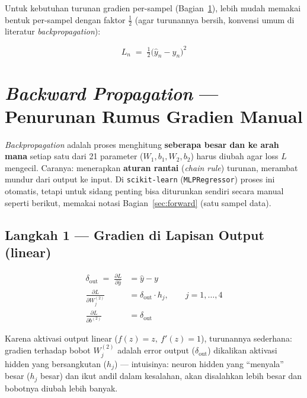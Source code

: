 \documentclass[11pt,a4paper]{article}
\begin{document}
Untuk kebutuhan turunan gradien per-sampel (Bagian~\ref{sec:backprop}), lebih mudah
memakai bentuk per-sampel dengan faktor $\tfrac12$ (agar turunannya bersih, konvensi umum
di literatur \emph{backpropagation}):

\begin{formulabox}
\[
  L_n \;=\; \tfrac{1}{2}\big(\hat{y}_n - y_n\big)^2
\]
\end{formulabox}

\section{\emph{Backward Propagation} --- Penurunan Rumus Gradien Manual}
\label{sec:backprop}

\emph{Backpropagation} adalah proses menghitung \textbf{seberapa besar dan ke arah mana}
setiap satu dari 21 parameter ($W_1,b_1,W_2,b_2$) harus diubah agar loss $L$ mengecil.
Caranya: menerapkan \textbf{aturan rantai} (\emph{chain rule}) turunan, merambat mundur
dari output ke input. Di \texttt{scikit-learn} (\texttt{MLPRegressor}) proses ini
otomatis, tetapi untuk sidang penting bisa diturunkan sendiri secara manual seperti
berikut, memakai notasi Bagian~\ref{sec:forward} (satu sampel data).

\subsection{Langkah 1 --- Gradien di Lapisan Output (linear)}

\begin{formulabox}
\begin{align}
  \delta_{\text{out}} \;=\; \frac{\partial L}{\partial \hat{y}} &= \hat{y}-y \label{eq:dout}\\[4pt]
  \frac{\partial L}{\partial W^{(2)}_j} &= \delta_{\text{out}}\cdot h_j, \qquad j=1,\dots,4 \\
  \frac{\partial L}{\partial b^{(2)}} &= \delta_{\text{out}}
\end{align}
\end{formulabox}

Karena aktivasi output linear ($f(z)=z,\ f'(z)=1$), turunannya sederhana: gradien
terhadap bobot $W^{(2)}_j$ adalah error output ($\delta_{\text{out}}$) dikalikan aktivasi
hidden yang bersangkutan ($h_j$) --- intuisinya: neuron hidden yang ``menyala'' besar
($h_j$ besar) dan ikut andil dalam kesalahan, akan disalahkan lebih besar dan bobotnya
diubah lebih banyak.
\end{document}
